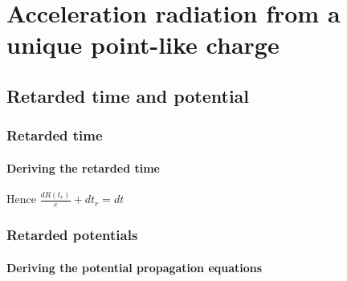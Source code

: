 \documentclass[a4paper,11pt,twoside,titlepage,openright]{book}
\numberwithin{equation}{section}
\begin{document}
\chapter{Acceleration radiation from a unique point-like charge}

\section{Retarded time and potential}
\subsection{Retarded time}

\subsubsection{Deriving the retarded time}
\label{Ap:RetardTime}

Hence $\frac{dR(t_r)}{c} + dt_r = dt$



\subsection{Retarded potentials}
\subsubsection{Deriving the potential propagation equations}
\label{Ap:PotentialPropagation}
\end{document}
